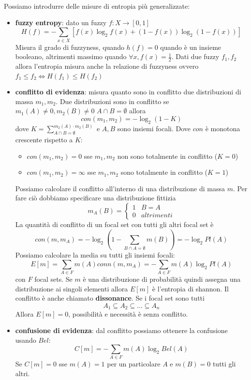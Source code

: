 Possiamo introdurre delle misure di entropia più generalizzate:
\begin{itemize}
    \item \textbf{fuzzy entropy}: dato un fuzzy $f:X\to [0,1]$  
    $$H(f) = -\sum_{x\in X }\left[ f(x)\log_2f(x) + (1-f(x))\log_2(1-f(x))\right]$$
    Misura il grado di fuzzyness, quando $h(f) = 0$ quando è un insieme booleano,
    altrimenti massimo quando $\forall x, f(x) = \frac{1}{2}$. Dati due fuzzy $f_1,f_2$
    allora l'entropia misura anche la relazione di fuzzyness ovvero $f_1\le f_2 \iff H(f_1)\le H(f_2)$
    \item \textbf{conflitto di evidenza}: misura quanto sono in conflitto due distribuzioni 
    di massa $m_1,m_2$. Due distribuzioni sono in conflitto se $m_1(A)\ne 0, m_2(B)\ne 0$ 
    $A\cap B=\emptyset$ allora 
    $$con(m_1,m_2) = -\log_2(1-K)$$
    dove $K=\sum_{A\cap B=\emptyset}^{m_2(A)\cdot m_2(B)}$ e $A,B$ sono insiemi 
    focali. Dove $con$ è monotona crescente rispetto a $K$:
    \begin{itemize}
        \item $con(m_1,m_2) = 0$ sse $m_1,m_2$ non sono totalmente in conflitto ($K=0$)
        \item $con(m_1,m_2) = \infty$ sse $m_1,m_2$ sono totalmente in conflitto ($K=1$)
    \end{itemize}
    Possiamo calcolare il conflitto all'interno di una distribuzione di massa $m$. Per 
    fare ciò dobbiamo specificare una distribuzione fittizia
    $$m_A(B) = \begin{cases}
        1 & B=A\\
        0&altrimenti
    \end{cases}$$
    La quantità di conflitto di un focal set  con tutti gli altri focal set è 
    $$con(m,m_A) = -\log_2(1-\sum_{B\cap A=\emptyset}m(B))=-\log_2Pl(A)$$
    Possiamo calcolare la media su tutti gli insiemi focali:
    $$E[m] = \sum_{A\in F}m(A)conn(m,m_A) = -\sum_{A\in F}m(A)\log_2Pl(A) $$
    con $F$ focal sets.
    Se $m$ è una distribuzione di probabilità quindi assegna una distribuzione 
    ai singoli elementi allora $E[m]$ è l'entropia di shannon.
    Il conflitto è anche chiamato \textbf{dissonance}. Se i focal set sono tutti 
    $$A_1\subseteq A_2 \subseteq \dots \subseteq A_n$$
    Allora $E[m]= 0$, possibilità e necessità è senza conflitto.
    \item \textbf{confusione di evidenza}: dal conflitto possiamo ottenere la confusione 
    usando $Bel$:
    $$C[m]=-\sum_{A\in F}m(A)\log_2Bel(A)$$
    Se $C[m]=0$ sse $m(A)=1$ per un particolare $A$ e $m(B)=0$ tutti gli altri.

\end{itemize}
